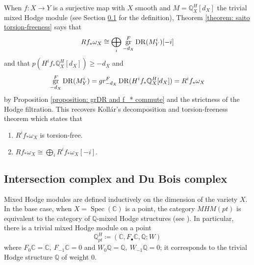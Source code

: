 \documentclass[11pt]{amsart}
\theoremstyle{definition}
\theoremstyle{plain}
\newcommand{\CC}{\mathbb C}
\newcommand{\QQ}{\mathbb Q}
\DeclareMathOperator{\DR}{DR}
\DeclareMathOperator{\Spec}{Spec}
\DeclareMathOperator{\gr}{{\rm gr}}
\newcommand{\Kollar}{Koll\'ar}
\begin{document}
When $f:X \to Y$ is a surjective map with $X$ smooth and $M = \QQ^H_X[d_X]$ the trivial mixed Hodge module (see Section \ref{section: Du Bois and intersection complex} for the definition), Theorem \ref{theorem: saito torsion-freeness} says that 
\[Rf_* \omega_X \cong \bigoplus_{i} \gr^F_{-d_X} \DR (M^i_{Y})[-i]\]
and that $p(H^i f_* \QQ_X^H[d_X]) \ge -d_X$ and
\[\gr^F_{-d_X} \DR(M^i_Y) = gr^F_{-d_X} \DR(H^if_* \QQ^H_X[d_X]) = R^if_* \omega_X\]
by Proposition \ref{proposition: grDR and f_* commute} and the strictness of the Hodge filtration. This recovers \Kollar{}'s decomposition and torsion-freeness theorem which states that 
\begin{enumerate}
    \item $R^if_* \omega_X$ is torsion-free.
    \item $Rf_* \omega_X \cong \bigoplus_i R^if_*\omega_X[-i]$.
\end{enumerate}

\subsection{Intersection complex and Du Bois complex} \label{section: Du Bois and intersection complex}

Mixed Hodge modules are defined inductively on the dimension of the variety $X$. In the base case, when $X = \Spec (\CC)$ is a point, the category $MHM(pt)$ is equivalent to the category of $\QQ$-mixed Hodge structures (see \cite[Theorem 3.9]{saito-MHM}). In particular, there is a trivial mixed Hodge module on a point 
\[\QQ^H_{pt} \coloneqq (\CC, F_\bullet \CC, \QQ; W)\]
where $F_0 \CC = \CC,\  F_{-1} \CC = 0$ and $W_0 \QQ = \QQ,\  W_{-1} \QQ = 0$; it corresponds to the trivial Hodge structure $\QQ$ of weight $0$. 
\end{document}
